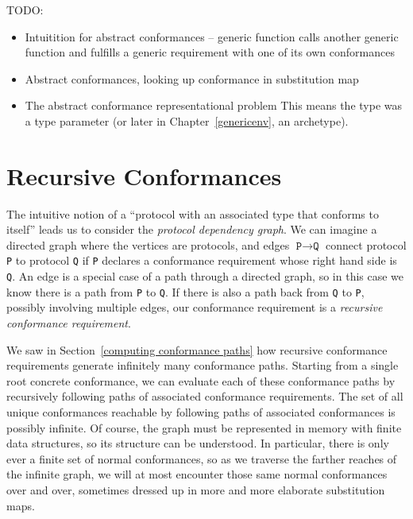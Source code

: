 \documentclass[a4paper,headsepline,bibliography=totoc,toc=flat,fleqn,twoside=semi]{scrbook}
\theoremstyle{definition}
\theoremstyle{definition}
\theoremstyle{definition}
\newcommand{\ifWIP}{\iffalse}
\begin{document}
TODO:
\begin{itemize}
\item Intuitition for abstract conformances -- generic function calls another generic function and fulfills a generic requirement with one of its own conformances
\item Abstract conformances, looking up conformance in substitution map
\item The abstract conformance representational problem This means the type was a type parameter (or later in Chapter~\ref{genericenv}, an archetype).
\end{itemize}
\fi

\section{Recursive Conformances}\label{recursive conformances}

\ifWIP

The intuitive notion of a ``protocol with an associated type that conforms to itself'' leads us to consider the \emph{protocol dependency graph}. We can imagine a directed graph where the vertices are protocols, and edges $\texttt{P}\rightarrow\texttt{Q}$ connect protocol \texttt{P} to protocol \texttt{Q} if \texttt{P} declares a conformance requirement whose right hand side is \texttt{Q}. An edge is a special case of a path through a directed graph, so in this case we know there is a path from \texttt{P} to \texttt{Q}. If there is also a path back from \texttt{Q} to \texttt{P}, possibly involving multiple edges, our conformance requirement is a \emph{recursive conformance requirement}.

We saw in Section~\ref{computing conformance paths} how recursive conformance requirements generate infinitely many conformance paths. Starting from a single root concrete conformance, we can evaluate each of these conformance paths by recursively following paths of associated conformance requirements. The set of all unique conformances reachable by following paths of associated conformances is possibly infinite. Of course, the graph must be represented in memory with finite data structures, so its structure can be understood. In particular, there is only ever a finite set of normal conformances, so as we traverse the farther reaches of the infinite graph, we will at most encounter those same normal conformances over and over, sometimes dressed up in more and more elaborate substitution maps.
\end{document}
